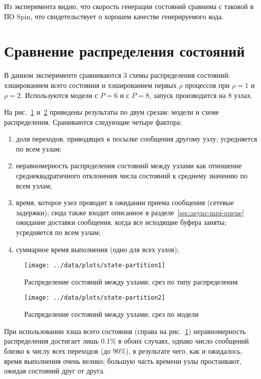 Из эксперимента видно, что скорость генерации состояний сравнима с таковой в ПО Spin, что
свидетельствует о хорошем качестве генерируемого кода.

\section{Сравнение распределения состояний}
\label{sec:experiment-partition-cmp}

В данном эксперименте сравниваются 3 схемы распределения состояний: хэшированием всего
состояния и хэшированием первых $\rho$ процессов при $\rho = 1$ и $\rho = 2$. Используются
модели  с $P = 6$ и  с $P = 8$, запуск производится на 8 узлах.

На рис.~\ref{fig:state-partition1} и~\ref{fig:state-partition2} приведены результаты по
двум срезам: модели и схеме распределения. Сраниваются следующие четыре фактора:
\begin{enumerate}
\item доля переходов, приводящих к посылке сообщения другому узлу; усредняется по всем
  узлам;
\item неравномерность распределения состояний между узлами как отношение
  среднеквадратичного отклонения числа состояний к среднему значению по всем узлам;
\item время, которое узел проводит в ожидании приема сообщения (сетевые задержки); сюда
  также входит описанное в разделе~\ref{sec:async-mpi-queue} ожидание доставки сообщения,
  когда все исходящие буфера заняты; усредняется по всем узлам;
\item суммарное время выполнения (одно для всех узлов);
\end{enumerate}

\begin{figure}[p]
  \centering
  \texttt{[image: ../data/plots/state-partition1]}
  \caption{Распределение состояний между узлами; срез по типу распределения}
  \label{fig:state-partition1}
\end{figure}

\begin{figure}[p]
  \centering
  \texttt{[image: ../data/plots/state-partition2]}
  \caption{Распределение состояний между узлами; срез по модели}
  \label{fig:state-partition2}
\end{figure}

При использовании хэша всего состояния (справа на рис.~\ref{fig:state-partition1})
неравномерность распределения достигает лишь 0.1\% в обоих случаях, однако число сообщений
близко к числу всех переходов (до 90\%), в результате чего, как и ожидалось, время
выполнения очень велико; большую часть времени узлы простаивают, ожидая состояний друг от
друга. 

